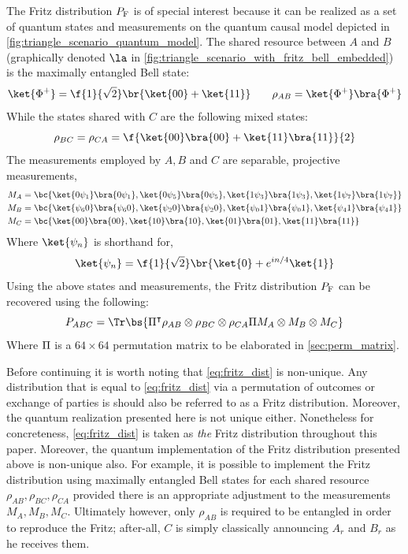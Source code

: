 \documentclass[aps, 10pt, english, twoside, pra, nofootinbib, tightenlines, longbibliography]{revtex4-1}
\begin{document}
    The Fritz distribution $\prob[\fritz]$ is of special interest because it can be realized as a set of quantum states and measurements on the quantum causal model depicted in \cref{fig:triangle_scenario_quantum_model}. The shared resource between $A$ and $B$ (graphically denoted $\la$ in \cref{fig:triangle_scenario_with_fritz_bell_embedded}) is the maximally entangled Bell state:
    \[ \ket{\Phi^+} = \f{1}{\sqrt{2}}\br{\ket{00} + \ket{11}} \qquad \rho_{AB} = \ket{\Phi^+}\bra{\Phi^+} \]
    While the states shared with $C$ are the following mixed states:
    \[ \rho_{BC} = \rho_{CA} = \f{\ket{00}\bra{00} + \ket{11}\bra{11}}{2} \]
    The measurements employed by $A,B$ and $C$ are separable, projective measurements,
    \begin{align*}
        M_{A} &= \bc{\ket{0\psi_{1}}\bra{0\psi_{1}}, \ket{0\psi_{5}}\bra{0\psi_{5}}, \ket{1\psi_{3}}\bra{1\psi_{3}}, \ket{1\psi_{7}}\bra{1\psi_{7}}} \\
        M_{B} &= \bc{\ket{\psi_{6}0}\bra{\psi_{6}0}, \ket{\psi_{2}0}\bra{\psi_{2}0}, \ket{\psi_{0}1}\bra{\psi_{0}1}, \ket{\psi_{4}1}\bra{\psi_{4}1}} \\
        M_{C} &= \bc{\ket{00}\bra{00}, \ket{10}\bra{10}, \ket{01}\bra{01}, \ket{11}\bra{11}}
    \end{align*}
    Where $\ket{\psi_n}$ is shorthand for,
    \[ \ket{\psi_n} = \f{1}{\sqrt{2}}\br{\ket{0} + e^{in/4}\ket{1}} \]
    Using the above states and measurements, the Fritz distribution $\prob[\fritz]$ can be recovered using the following:
    \[ \prob[ABC] = \Tr\bs{\netperm^\intercal \rho_{AB}\otimes\rho_{BC}\otimes\rho_{CA} \netperm M_{A}\otimes M_{B} \otimes M_{C}} \]
    Where $\Pi$ is a $64 \times 64$ permutation matrix to be elaborated in \cref{sec:perm_matrix}.

    Before continuing it is worth noting that \cref{eq:fritz_dist} is non-unique. Any distribution that is equal to \cref{eq:fritz_dist} via a permutation of outcomes or exchange of parties is should also be referred to as a Fritz distribution. Moreover, the quantum realization presented here is not unique either. Nonetheless for concreteness, \cref{eq:fritz_dist} is taken as \textit{the} Fritz distribution throughout this paper. Moreover, the quantum implementation of the Fritz distribution presented above is non-unique also. For example, it is possible to implement the Fritz distribution using maximally entangled Bell states for each shared resource $\rho_{AB}, \rho_{BC}, \rho_{CA}$ provided there is an appropriate adjustment to the measurements $M_A, M_B, M_C$. Ultimately however, only $\rho_{AB}$ is required to be entangled in order to reproduce the Fritz; after-all, $C$ is simply classically announcing $A_r$ and $B_r$ as he receives them.
\end{document}
